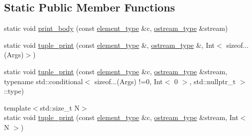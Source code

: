 \subsection*{Static Public Member Functions}
\begin{DoxyCompactItemize}
\item 
static void \mbox{\hyperlink{structutils_1_1print__container__helper_1_1printer_3_01std_1_1tuple_3_01_args_8_8_8_01_4_01_4_a7eb293dd1d715368075eeec5e16c0759}{print\+\_\+body}} (const \mbox{\hyperlink{structutils_1_1print__container__helper_1_1printer_3_01std_1_1tuple_3_01_args_8_8_8_01_4_01_4_a1ca86cb16c37518fb257879ce8026459}{element\+\_\+type}} \&c, \mbox{\hyperlink{structutils_1_1print__container__helper_1_1printer_3_01std_1_1tuple_3_01_args_8_8_8_01_4_01_4_a7a89933fa31d7a79f454cdf36211a73a}{ostream\+\_\+type}} \&stream)
\item 
static void \mbox{\hyperlink{structutils_1_1print__container__helper_1_1printer_3_01std_1_1tuple_3_01_args_8_8_8_01_4_01_4_aea264172a79f5fae5cbb74924bf1dd91}{tuple\+\_\+print}} (const \mbox{\hyperlink{structutils_1_1print__container__helper_1_1printer_3_01std_1_1tuple_3_01_args_8_8_8_01_4_01_4_a1ca86cb16c37518fb257879ce8026459}{element\+\_\+type}} \&, \mbox{\hyperlink{structutils_1_1print__container__helper_1_1printer_3_01std_1_1tuple_3_01_args_8_8_8_01_4_01_4_a7a89933fa31d7a79f454cdf36211a73a}{ostream\+\_\+type}} \&, Int$<$ sizeof...(Args)$>$)
\item 
static void \mbox{\hyperlink{structutils_1_1print__container__helper_1_1printer_3_01std_1_1tuple_3_01_args_8_8_8_01_4_01_4_a035a8325caf8476f25935e077862a4c8}{tuple\+\_\+print}} (const \mbox{\hyperlink{structutils_1_1print__container__helper_1_1printer_3_01std_1_1tuple_3_01_args_8_8_8_01_4_01_4_a1ca86cb16c37518fb257879ce8026459}{element\+\_\+type}} \&c, \mbox{\hyperlink{structutils_1_1print__container__helper_1_1printer_3_01std_1_1tuple_3_01_args_8_8_8_01_4_01_4_a7a89933fa31d7a79f454cdf36211a73a}{ostream\+\_\+type}} \&stream, typename std\+::conditional$<$ sizeof...(Args) !=0, Int$<$ 0 $>$, std\+::nullptr\+\_\+t $>$\+::type)
\item 
{\footnotesize template$<$std\+::size\+\_\+t N$>$ }\\static void \mbox{\hyperlink{structutils_1_1print__container__helper_1_1printer_3_01std_1_1tuple_3_01_args_8_8_8_01_4_01_4_a5b8429f1d2269ad890ccadbe461baf1b}{tuple\+\_\+print}} (const \mbox{\hyperlink{structutils_1_1print__container__helper_1_1printer_3_01std_1_1tuple_3_01_args_8_8_8_01_4_01_4_a1ca86cb16c37518fb257879ce8026459}{element\+\_\+type}} \&c, \mbox{\hyperlink{structutils_1_1print__container__helper_1_1printer_3_01std_1_1tuple_3_01_args_8_8_8_01_4_01_4_a7a89933fa31d7a79f454cdf36211a73a}{ostream\+\_\+type}} \&stream, Int$<$ N $>$)
\end{DoxyCompactItemize}


